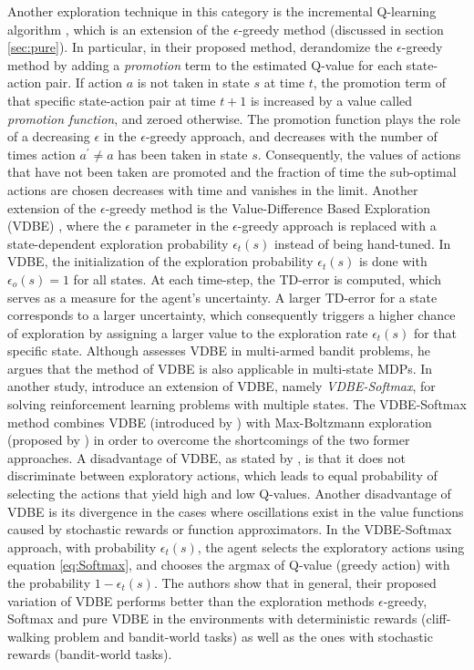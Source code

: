 Another exploration technique in this category is the incremental Q-learning algorithm , which is an extension of the $\epsilon$-greedy method (discussed in section \ref{sec:pure}). In particular, in their proposed method,  derandomize the $\epsilon$-greedy method by adding a \emph{promotion} term to the estimated Q-value for each state-action pair. If action $a$ is not taken in state $s$ at time $t$, the promotion term of that specific state-action pair at time $t+1$ is increased by a value called \emph{promotion function}, and zeroed otherwise. The promotion function plays the role of a decreasing $\epsilon$ in the $\epsilon$-greedy approach, and decreases with the number of times action $a^\prime\neq a$ has been taken in state $s$. Consequently, the values of actions that have not been taken are promoted and the fraction of time the sub-optimal actions are chosen decreases with time and vanishes in the limit.
Another extension of the $\epsilon$-greedy method is the Value-Difference Based Exploration (VDBE) , where the $\epsilon$ parameter in the $\epsilon$-greedy approach is replaced with a state-dependent exploration probability $\epsilon_t(s)$ instead of being hand-tuned. In VDBE, the initialization of the exploration probability $\epsilon_t(s)$  is done with $\epsilon_o(s)=1$ for all states. At each time-step, the TD-error is computed, which serves as a measure for the agent's uncertainty. A larger TD-error for a state corresponds to a larger uncertainty, which consequently triggers a higher chance of exploration by assigning a larger value to the exploration rate $\epsilon_t(s)$ for that specific state. 
Although  assesses VDBE in multi-armed bandit problems, he argues that the method of VDBE is also applicable in multi-state MDPs. In another study,  introduce an extension of VDBE, namely \emph{VDBE-Softmax}, for solving reinforcement learning problems with multiple states. The VDBE-Softmax method combines VDBE (introduced by ) with Max-Boltzmann exploration (proposed by ) in order to overcome the shortcomings of the two former approaches. A disadvantage of VDBE, as stated by , is that it does not discriminate between exploratory actions, which leads to equal probability of selecting the actions that yield high and low Q-values. Another disadvantage of VDBE is its divergence in the cases where oscillations exist in the value functions caused by stochastic rewards or function approximators. In the VDBE-Softmax approach, with probability $\epsilon_t(s)$, the agent selects the exploratory actions using equation \ref{eq:Softmax}, and chooses the argmax of Q-value (greedy action) with the probability $1-\epsilon_t(s)$. The authors show that in general, their proposed variation of VDBE performs better than the exploration methods $\epsilon$-greedy, Softmax and pure VDBE in the environments with deterministic rewards (cliff-walking problem and bandit-world tasks) as well as the ones with stochastic rewards (bandit-world tasks).
